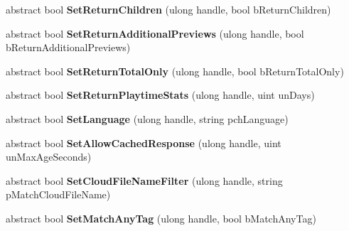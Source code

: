 \begin{DoxyCompactItemize}
abstract bool {\bfseries Set\+Return\+Children} (ulong handle, bool b\+Return\+Children)
\item 
\mbox{\label{class_valve_1_1_steamworks_1_1_i_steam_u_g_c_ae71dc26b8d33184dbf03ec8d81395284}} 
abstract bool {\bfseries Set\+Return\+Additional\+Previews} (ulong handle, bool b\+Return\+Additional\+Previews)
\item 
\mbox{\label{class_valve_1_1_steamworks_1_1_i_steam_u_g_c_a124b3a5013445210006d0393b92f353e}} 
abstract bool {\bfseries Set\+Return\+Total\+Only} (ulong handle, bool b\+Return\+Total\+Only)
\item 
\mbox{\label{class_valve_1_1_steamworks_1_1_i_steam_u_g_c_ada453f7c1e566f732e70bb24dd615ba7}} 
abstract bool {\bfseries Set\+Return\+Playtime\+Stats} (ulong handle, uint un\+Days)
\item 
\mbox{\label{class_valve_1_1_steamworks_1_1_i_steam_u_g_c_a6048597323ee9d5848fe4a2676599dc8}} 
abstract bool {\bfseries Set\+Language} (ulong handle, string pch\+Language)
\item 
\mbox{\label{class_valve_1_1_steamworks_1_1_i_steam_u_g_c_ae955eb13c7bc6c6c9037f50e26a80bb8}} 
abstract bool {\bfseries Set\+Allow\+Cached\+Response} (ulong handle, uint un\+Max\+Age\+Seconds)
\item 
\mbox{\label{class_valve_1_1_steamworks_1_1_i_steam_u_g_c_a5e25a55ffd5b5a127ed51ea32b324bd3}} 
abstract bool {\bfseries Set\+Cloud\+File\+Name\+Filter} (ulong handle, string p\+Match\+Cloud\+File\+Name)
\item 
\mbox{\label{class_valve_1_1_steamworks_1_1_i_steam_u_g_c_a351a6ca6d3018e806d0d794416b40046}} 
abstract bool {\bfseries Set\+Match\+Any\+Tag} (ulong handle, bool b\+Match\+Any\+Tag)
\item 
\mbox{\label{class_valve_1_1_steamworks_1_1_i_steam_u_g_c_ae37b4601c179542fec006df348416524}} 

\end{DoxyCompactItemize}
